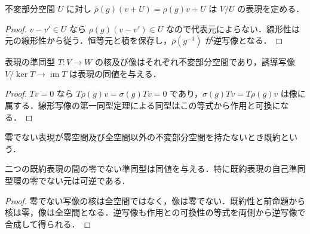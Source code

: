 \begin{prop}[商表現]
不変部分空間 $U$ に対し $\bar\rho(g)(v+U)=\rho(g)v+U$ は $V/U$ の表現を定める．
\end{prop}
\begin{proof}
$v-v'\in U$ なら $\rho(g)(v-v')\in U$ なので代表元によらない．線形性は元の線形性から従う．恒等元と積を保存し，$\bar\rho(g^{-1})$ が逆写像となる．
\end{proof}
\begin{prop}[準同型の核と像]
表現の準同型 $T:V\to W$ の核及び像はそれぞれ不変部分空間であり，誘導写像 $V/\ker T\to\operatorname{im}T$ は表現の同値を与える．
\end{prop}
\begin{proof}
$Tv=0$ なら $T\rho(g)v=\sigma(g)Tv=0$ であり，$\sigma(g)Tv=T\rho(g)v$ は像に属する．線形写像の第一同型定理による同型はこの等式から作用と可換になる．
\end{proof}
\begin{defn}[既約表現]
零でない表現が零空間及び全空間以外の不変部分空間を持たないとき既約という．
\end{defn}
\begin{prop}[Schurの補題]
二つの既約表現の間の零でない準同型は同値を与える．特に既約表現の自己準同型環の零でない元は可逆である．
\end{prop}
\begin{proof}
零でない写像の核は全空間ではなく，像は零でない．既約性と前命題から核は零，像は全空間となる．逆写像も作用との可換性の等式を両側から逆写像で合成して得られる．
\end{proof}
